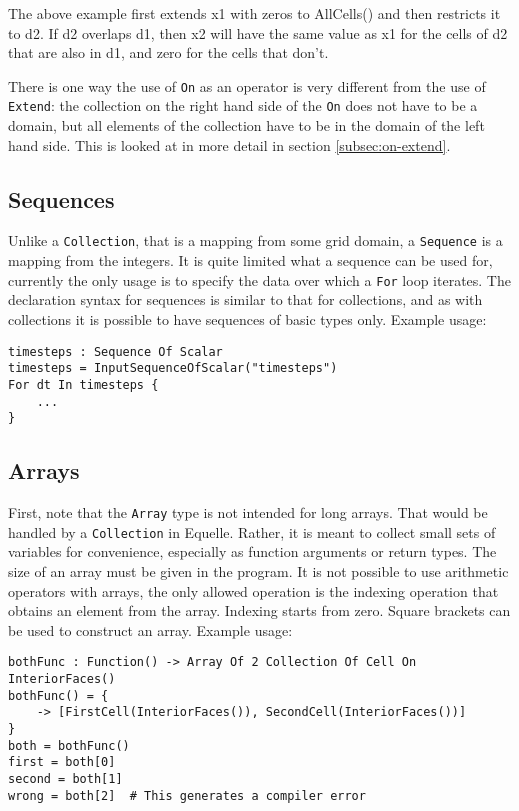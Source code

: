 \documentclass[11pt]{article}
\newcommand{\code}[1]{\texttt{#1}}
\begin{document}
The above example first extends x1 with zeros to AllCells() and then restricts it to
d2. If d2 overlaps d1, then x2 will have the same value as x1 for the cells of d2 that are
also in d1, and zero for the cells that don't.

There is one way the use of \code{On} as an operator is very different from the use of
\code{Extend}: the collection on the right hand side of the \code{On} does not have to be
a domain, but all elements of the collection have to be in the domain of the left hand
side. This is looked at in more detail in section \ref{subsec:on-extend}.

\subsection{Sequences}

Unlike a \code{Collection}, that is a mapping from some grid domain, a \code{Sequence} is
a mapping from the integers. It is quite limited what a sequence can be used for,
currently the only usage is to specify the data over which a \code{For} loop iterates. The
declaration syntax for sequences is similar to that for collections, and as with
collections it is possible to have sequences of basic types only. Example usage:
\begin{verbatim}
timesteps : Sequence Of Scalar
timesteps = InputSequenceOfScalar("timesteps")
For dt In timesteps {
    ...
}
\end{verbatim}

\subsection{Arrays}

First, note that the \code{Array} type is not intended for long arrays. That would be
handled by a \code{Collection} in Equelle. Rather, it is meant to collect small sets of
variables for convenience, especially as function arguments or return types. The size of
an array must be given in the program. It is not possible to use arithmetic operators with
arrays, the only allowed operation is the indexing operation that obtains an element from
the array. Indexing starts from zero. Square brackets can be used to construct an
array. Example usage:
\begin{verbatim}
bothFunc : Function() -> Array Of 2 Collection Of Cell On InteriorFaces()
bothFunc() = {
    -> [FirstCell(InteriorFaces()), SecondCell(InteriorFaces())]
}
both = bothFunc()
first = both[0]
second = both[1]
wrong = both[2]  # This generates a compiler error
\end{verbatim}
\end{document}
